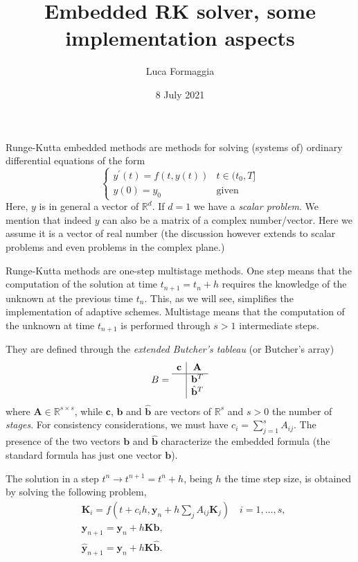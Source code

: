 \documentclass[10pt,a4paper,twoside]{article}
\title{Embedded RK solver, some implementation aspects}
\author{Luca Formaggia}
\date{8 July 2021}
\begin{document}
    \maketitle
    
    Runge-Kutta embedded methods are methods for solving (systems of) ordinary differential equations of the form
    \[
    \begin{cases}
    y^\prime(t)=f(t,y(t)) & t\in (t_0,T]\\
    y(0)=y_0 & \text{given}
    \end{cases}
    \]
Here, $y$ is in general a vector of $\mathbb{R}^d$. If $d=1$ we have a \emph{scalar problem}.
We mention that indeed $y$ can also be a matrix of a complex number/vector. 
Here we assume it is a vector of real number (the discussion however extends to scalar problems and 
even problems in the complex plane.)


Runge-Kutta methods are one-step multistage methods. 
One step means that the computation of the solution at time $t_{n+1}=t_n+h$ requires the knowledge of the unknown at the previous time $t_n$.
This, as we will see, simplifies the implementation of adaptive schemes.
Multistage means that the computation of the unknown at time $t_{n+1}$ is performed through $s>1$ intermediate steps. 


They are defined through the \emph{extended Butcher's tableau} (or Butcher's array)
\[
B=\begin{array}{c|c}
\mathbf{c}& \mathbf{A}\\
\hline
& \mathbf{b}^T\\
& \hat{\mathbf{b}}^T
\end{array}
\]
where $\mathbf{A}\in\mathbb{R}^{s\times s}$, while $\mathbf{c}$, $\mathbf{b}$ and $\hat{\mathbf{b}}$ are vectors of $\mathbb{R}^s$ and $s>0$ the number of \emph{stages}.
For consistency considerations, we must have $c_i=\sum_{j=1}^s A_{ij}$.
The presence of the two vectors $\mathbf{b}$ and $\hat{\mathbf{b}}$ characterize the embedded formula (the standard formula has just one vector $\mathbf{b}$).


The solution in a step $t^n\to t^{n+1}=t^n+h$, being $h$ the time step size, is obtained by solving the following problem,
\begin{align}\label{eq:rk1}
&\mathbf{K}_i = f(t+c_ih,\mathbf{y}_n+h\sum_j A_{ij}\mathbf{K}_j)\quad i=1,\ldots,s,\\
\label{eq:rkt}
&\mathbf{y}_{n+1}=\mathbf{y}_n + h \mathbf{K}\mathbf{b},\\\label{eq:rk3}
&\hat{\mathbf{y}}_{n+1}=\mathbf{y}_n + h \mathbf{K}\hat{\mathbf{b}}.
\end{align}
\end{document}
